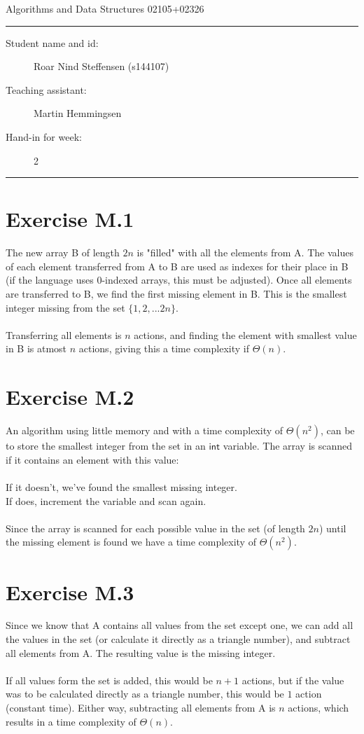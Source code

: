 \documentclass[11pt]{article}
\begin{document}
\begin{center}
{{\Large \sc Algorithms and Data Structures 02105+02326}}
\end{center}
\rule{\textwidth}{1pt}
\begin{description}
\item[Student name and id:] Roar Nind Steffensen (s144107)
\item[Teaching assistant:] Martin Hemmingsen
\item[Hand-in for week:] 2
\end{description}
\rule{\textwidth}{1pt}
 

\section*{Exercise M.1}

The new array B of length $2n$ is "filled" with all the elements from A. The values of each element transferred from A to B are used as indexes for their place in B (if the language uses 0-indexed arrays, this must be adjusted). Once all elements are transferred to B, we find the first missing element in B. This is the smallest integer missing from the set $\{1, 2, ... 2n\}$.
\\
\\
Transferring all elements is $n$ actions, and finding the element with smallest value in B is atmost $n$ actions, giving this a time complexity if $\Theta(n)$.

\section*{Exercise M.2}

An algorithm using little memory and with a time complexity of $\Theta(n^2)$, can be to store the smallest integer from the set in an $\mathsf{int}$ variable. The array is scanned if it contains an element with this value:\\
\\
If it doesn't, we've found the smallest missing integer. \\
If does, increment the variable and scan again. \\
\\
Since the array is scanned for each possible value in the set (of length $2n$) until the missing element is found we have a time complexity of $\Theta(n^2)$.

\section*{Exercise M.3}

Since we know that A contains all values from the set except one, we can add all the values in the set (or calculate it directly as a triangle number), and subtract all elements from A. The resulting value is the missing integer.\\
\\
If all values form the set is added, this would be $n+1$ actions, but if the value was to be calculated directly as a triangle number, this would be $1$ action (constant time). Either way, subtracting all elements from A is $n$ actions, which results in a time complexity of $\Theta(n)$.
\end{document}
